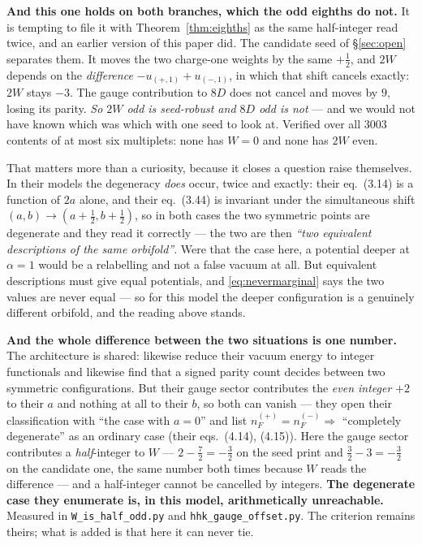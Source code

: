 \documentclass[11pt,a4paper]{article}
\begin{document}
\noindent \textbf{And this one holds on both branches, which the odd eighths do not.} It is
tempting to file it with Theorem~\ref{thm:eighths} as the same half-integer read twice, and an
earlier version of this paper did. The candidate seed of \S\ref{sec:open} separates them. It moves
the two charge-one weights by the same $+\tfrac12$, and $2W$ depends on the \emph{difference}
$-u_{(+,1)}+u_{(-,1)}$, in which that shift cancels exactly: $2W$ stays $-3$. The gauge
contribution to $8D$ does not cancel and moves by $9$, losing its parity. \emph{So $2W$ odd is
seed-robust and $8D$ odd is not} --- and we would not have known which was which with one seed to
look at. Verified over all $3003$ contents of at most six multiplets:
none has $W=0$ and none has $2W$ even.

That matters more than a curiosity, because it closes a question \cite{CCD24} raise themselves. In
their models the degeneracy \emph{does} occur, twice and exactly: their eq.~(3.14) is a function of
$2a$ alone, and their eq.~(3.44) is invariant under the simultaneous shift
$(a,b)\to(a+\tfrac12,b+\tfrac12)$, so in both cases the two symmetric points are degenerate and
they read it correctly --- the two are then \emph{``two equivalent descriptions of the same
orbifold''}. Were that the case here, a potential deeper at $\alpha=1$ would be a relabelling and
not a false vacuum at all. But equivalent descriptions must give equal potentials, and
\eqref{eq:nevermarginal} says the two values are never equal --- so for this model the deeper
configuration is a genuinely different orbifold, and the reading above stands.

\noindent \textbf{And the whole difference between the two situations is one number.} The
architecture is shared: \cite{HHK03} likewise reduce their vacuum energy to integer functionals and
likewise find that a signed parity count decides between two symmetric configurations. But their
gauge sector contributes the \emph{even integer} $+2$ to their $a$ and nothing at all to their $b$,
so both can vanish --- they open their classification with ``the case with $a=0$'' and list
$n_F^{(+)}=n_F^{(-)}\Rightarrow$ ``completely degenerate'' as an ordinary case (their eqs.~(4.14),
(4.15)). Here the gauge sector contributes a \emph{half}-integer to $W$ --- $2-\tfrac72=-\tfrac32$ on the
seed \cite{KM25} print and $\tfrac32-3=-\tfrac32$ on the candidate one, the same number both times
because $W$ reads the difference --- and a half-integer cannot be cancelled by integers. \textbf{The degenerate case they enumerate is, in this model, arithmetically
unreachable.} Measured in \texttt{W\_\allowbreak is\_\allowbreak half\_\allowbreak odd.py} and
\texttt{hhk\_\allowbreak gauge\_\allowbreak offset.py}. The criterion remains theirs; what is added
is that here it can never tie.
\end{document}
